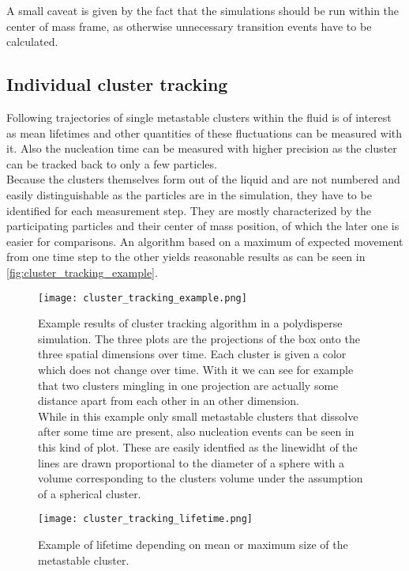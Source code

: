 A small caveat is given by the fact that the simulations should be run within the center of mass frame, as otherwise unnecessary transition events have to be calculated.%
\subsection{Individual cluster tracking}
\label{sec:tracking}
Following trajectories of single metastable clusters within the fluid is of interest as mean lifetimes and other quantities of these fluctuations can be measured with it. Also the nucleation time can be measured with higher precision as the cluster can be tracked back to only a few particles.\\ 
Because the clusters themselves form out of the liquid and are not numbered and easily distinguishable as the particles are in the simulation, they have to be identified for each measurement step. They are mostly characterized by the participating particles and their center of mass position, of which the later one is easier for comparisons. An algorithm based on a maximum of expected movement from one time step to the other yields reasonable results as can be seen in \autoref{fig:cluster_tracking_example}.


\begin{figure}[h]
\centering
\texttt{[image: cluster\_tracking\_example.png]}
\caption[Individual cluster tracking example]{Example results of cluster tracking algorithm in a polydisperse simulation. The three plots are the projections of the box onto the three spatial dimensions over time. Each cluster is given a color which does not change over time. With it we can see for example that two clusters mingling in one projection are actually some distance apart from each other in an other dimension.\\
While in this example only small metastable clusters that dissolve after some time are present, also nucleation events can be seen in this kind of plot. These are easily identfied as the linewidht of the lines are drawn proportional to the diameter of a sphere with a volume corresponding to the clusters volume under the assumption of a spherical cluster.}
\label{fig:cluster_tracking_example}
\end{figure}

\begin{figure}[h]
\centering
\texttt{[image: cluster\_tracking\_lifetime.png]}
\caption[Size depending on lifetime of clusters example]{Example of lifetime depending on mean or maximum size of the metastable cluster. }
\label{fig:lifetime}
\end{figure}

